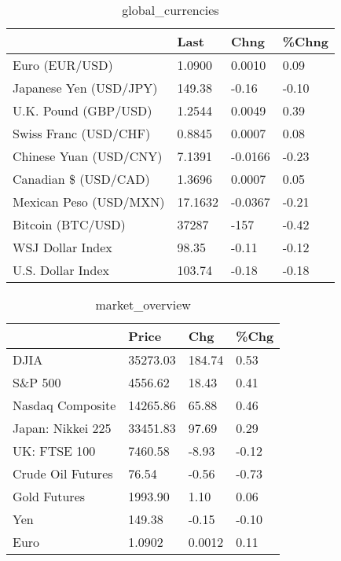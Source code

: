 \documentclass{article}%
\begin{document}
%


\begin{table}[htbp]%
\caption{global\_currencies}%
\centering%
\begin{adjustbox}{width=1\textwidth}%
\begin{tabular}{llll}
\toprule
                       &    Last &    Chng & \%Chng \\
\midrule
        Euro (EUR/USD) &  1.0900 &  0.0010 &  0.09 \\
Japanese Yen (USD/JPY) &  149.38 &   -0.16 & -0.10 \\
  U.K. Pound (GBP/USD) &  1.2544 &  0.0049 &  0.39 \\
 Swiss Franc (USD/CHF) &  0.8845 &  0.0007 &  0.08 \\
Chinese Yuan (USD/CNY) &  7.1391 & -0.0166 & -0.23 \\
  Canadian \$ (USD/CAD) &  1.3696 &  0.0007 &  0.05 \\
Mexican Peso (USD/MXN) & 17.1632 & -0.0367 & -0.21 \\
     Bitcoin (BTC/USD) &   37287 &    -157 & -0.42 \\
      WSJ Dollar Index &   98.35 &   -0.11 & -0.12 \\
     U.S. Dollar Index &  103.74 &   -0.18 & -0.18 \\
\bottomrule
\end{tabular}
%
\end{adjustbox}%
\end{table}

%


\begin{table}[htbp]%
\caption{market\_overview}%
\centering%
\begin{adjustbox}{width=1\textwidth}%
\begin{tabular}{llll}
\toprule
                  &    Price &    Chg &  \%Chg \\
\midrule
             DJIA & 35273.03 & 184.74 &  0.53 \\
          S\&P 500 &  4556.62 &  18.43 &  0.41 \\
 Nasdaq Composite & 14265.86 &  65.88 &  0.46 \\
Japan: Nikkei 225 & 33451.83 &  97.69 &  0.29 \\
     UK: FTSE 100 &  7460.58 &  -8.93 & -0.12 \\
Crude Oil Futures &    76.54 &  -0.56 & -0.73 \\
     Gold Futures &  1993.90 &   1.10 &  0.06 \\
              Yen &   149.38 &  -0.15 & -0.10 \\
             Euro &   1.0902 & 0.0012 &  0.11 \\
\bottomrule
\end{tabular}
%
\end{adjustbox}%
\end{table}

%
\end{document}
